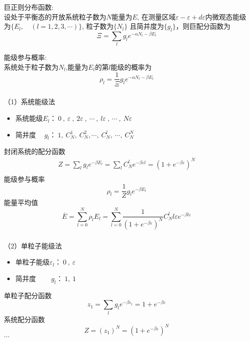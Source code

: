 \begin{frame}
  \frametitle{}
  \alert{巨正则分布函数:} \\ 
  设处于平衡态的开放系统粒子数为$N$能量为$E$, 在测量区域$\varepsilon - \varepsilon+ d\varepsilon $内微观态能级为$\{ E_l, \quad (l=1,2,3,\cdots )\}$, 粒子数为$\{ N_l \}$ 且简并度为$\{ g_l \}$，则巨配分函数为
  \[ \Xi= \sum_l g_l e^{- \alpha  N_l - \beta E_l } \]  

  \alert{能级参与概率:}  \\
  系统处于粒子数为$ N_l$,能量为$ E_l $的第$l$能级的概率为 
  \begin{equation}
    \boxed{\rho _l  =  \frac{1}{\Xi} g_l e^{- \alpha  N_l - \beta E_l }} 
  \end{equation}
\end{frame} 

\begin{frame}
  \frametitle{}
\解 （1）系统能级法
\begin{itemize}
  \item 系统能级$E_l$：$~0~,~\varepsilon~, ~2\varepsilon~, ~\cdots~ , ~l\varepsilon~, ~\cdots~, ~N \varepsilon~ $ 
  \item 简并度$\quad~ g_l$：$~1,~C_N^1, ~C_N^2, \cdots , ~C_N^l, ~\cdots, ~C_N^N $
\end{itemize}
封闭系统的配分函数
\[\begin{aligned}
 Z = \sum_l g_l e^{-\beta E_l} = \sum_l C_N^l e^{-\beta \varepsilon l} = (1+e^{-\beta \varepsilon})^N \\ 
\end{aligned} 
  \]
  能级参与概率
  \[ \rho _l = \frac{1}{Z} g_l e^{-\beta E_l} \]
  能量平均值
  \[ \overline{E} = \sum_{l=0}^N \rho _l E_l = \sum_{l=0}^N\frac{1}{(1+e^{-\beta \varepsilon})^N } C_N^l l\varepsilon  e^{-\beta l\varepsilon} \]
\end{frame} 

\begin{frame}
  \frametitle{}
  （2）单粒子能级法
  \begin{itemize}
    \item 单粒子能级$\varepsilon_l$：$~0~,~\varepsilon~$ 
    \item 简并度$\quad\quad~ g_l$：$~1,~1$
  \end{itemize}
  单粒子配分函数 
  \[z_1 = \sum_l g_l e^{-\beta \varepsilon_l} = 1+ e^{-\beta \varepsilon} \]
  系统配分函数
  \[Z = (z_1)^N =  (1+e^{-\beta \varepsilon})^N\]
  $\dots$
\end{frame} 

